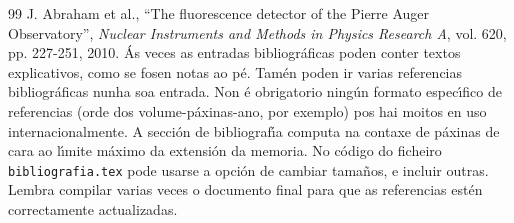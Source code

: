 \renewcommand{\refname}{Referencias}  %

\begin{thebibliography}{99}
 J. Abraham et al., ``The fluorescence detector of the Pierre Auger Observatory'', {\it Nuclear Instruments and Methods in Physics Research A}, vol. 620, pp. 227-251, 2010.
 \'As veces as entradas bibliogr\'aficas poden conter textos explicativos, como se fosen notas ao p\'e. Tam\'en poden ir varias referencias bibliogr\'aficas nunha soa entrada. Non \'e obrigatorio ning\'un formato espec\'{\i}fico de referencias (orde dos volume-p\'axinas-ano, por exemplo) pos hai moitos en uso internacionalmente. A secci\'on de bibliograf\'{\i}a computa na contaxe de p\'axinas de cara ao l\'{\i}mite m\'aximo da extensi\'on da memoria. No c\'odigo do ficheiro {\tt bibliografia.tex} pode usarse a opci\'on de cambiar tama\~nos, e incluir outras. Lembra compilar varias veces o documento final para que as referencias est\'en correctamente actualizadas.
\end{thebibliography}
